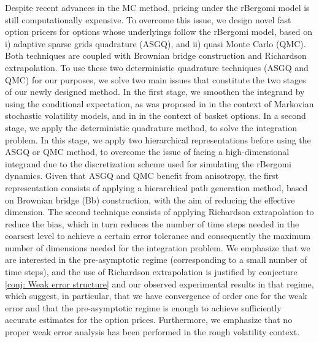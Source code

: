 Despite recent advances in the MC method, pricing under the rBergomi model is still computationally expensive. To overcome this issue,  we design  novel fast option pricers  for options whose underlyings follow the rBergomi model,  based on i) adaptive sparse grids quadrature (ASGQ), and ii) quasi Monte Carlo (QMC). Both techniques are coupled with Brownian bridge construction and Richardson extrapolation.  To use these two deterministic quadrature techniques (ASGQ and QMC) for our purposes, we  solve two main issues that constitute the two stages of our newly designed method. In the first stage, we smoothen the integrand by using the conditional expectation, as was proposed in \cite{romano1997contingent} in the context of Markovian stochastic volatility  models, and in \cite{bayersmoothing} in the context of basket options.   In a second stage, we apply the deterministic quadrature method, to solve the integration problem. In this stage, we apply two hierarchical representations before using the ASGQ or QMC method, to overcome the issue of facing a high-dimensional integrand due to the discretization scheme used for simulating the rBergomi dynamics. Given that ASGQ and QMC benefit from anisotropy, the first representation consists of applying a hierarchical  path generation method, based on Brownian
bridge (Bb) construction, with the aim of reducing the effective dimension. The second technique consists of applying Richardson extrapolation to reduce the bias, which in turn reduces the  number of time steps needed in the coarsest level to achieve a certain error tolerance and consequently  the maximum number of dimensions needed for the integration problem. We emphasize that we are interested in  the pre-asymptotic regime (corresponding to a small number of time steps), and the use of Richardson extrapolation is justified by conjecture \ref{conj: Weak error structure} and our observed experimental results in that regime,  which suggest, in particular, that we have convergence of order one for the weak error and  that the pre-asymptotic regime is enough to achieve sufficiently accurate estimates for the option prices. Furthermore, we emphasize that no proper weak error analysis has been performed in the rough volatility context.

